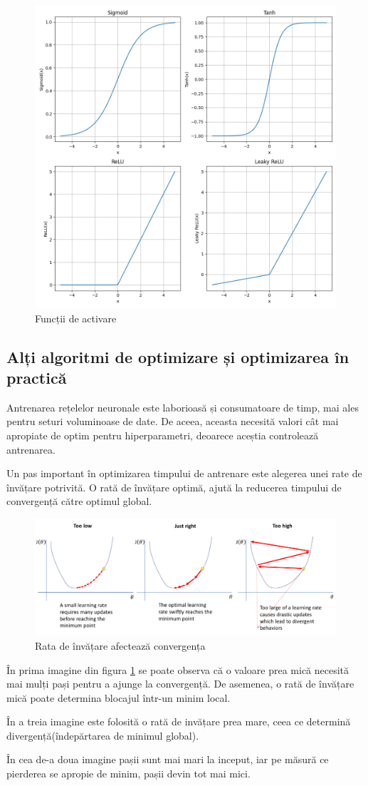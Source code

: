 \newpage

\begin{figure}[h]
         \centering 
         \includegraphics[width=.75\linewidth]{images/activation_functions.png}
         \captionsetup{font=footnotesize}
         \caption{Funcții de activare}
\end{figure}

\subsection{Alți algoritmi de optimizare și optimizarea în practică}

Antrenarea rețelelor neuronale este laborioasă și consumatoare de timp, mai ales pentru seturi voluminoase de date. De aceea, aceasta necesită valori cât mai apropiate de optim pentru hiperparametri, deoarece aceștia controlează antrenarea. 

Un pas important în optimizarea timpului de antrenare este alegerea unei rate de învățare potrivită. O rată de învățare optimă, ajută la reducerea timpului de convergență către optimul global. 

\begin{figure}[h]
         \centering 
         \includegraphics[width=.65\linewidth]{images/learning_rate.png}
         \captionsetup{font=footnotesize}
         \caption{Rata de învățare afectează convergența\cite{learning-rate}}
         \label{Figura 2.7}
\end{figure}
\newpage
În prima imagine din figura \ref{Figura 2.7} se poate observa că o valoare prea mică necesită mai mulți pași pentru a ajunge la convergență. De asemenea, o rată de învățare mică poate determina blocajul într-un minim local. 

În a treia imagine este folosită o rată de invățare prea mare, ceea ce determină divergență(îndepărtarea de minimul global). 

În cea de-a doua imagine pașii sunt mai mari la inceput, iar pe măsură ce pierderea se apropie de minim, pașii devin tot mai mici.
